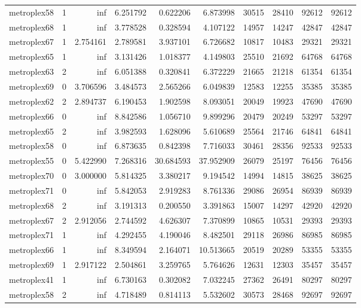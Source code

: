 \begin{longtable}{|l|r|r|r|r|r|r|r|r|r|}
metroplex58 & 1 & inf & 6.251792 & 0.622206 & 6.873998 & 30515 & 28410 & 92612 & 92612 \\
metroplex68 & 1 & inf & 3.778528 & 0.328594 & 4.107122 & 14957 & 14247 & 42847 & 42847 \\
metroplex67 & 1 & 2.754161 & 2.789581 & 3.937101 & 6.726682 & 10817 & 10483 & 29321 & 29321 \\
metroplex65 & 1 & inf & 3.131426 & 1.018377 & 4.149803 & 25510 & 21692 & 64768 & 64768 \\
metroplex63 & 2 & inf & 6.051388 & 0.320841 & 6.372229 & 21665 & 21218 & 61354 & 61354 \\
metroplex69 & 0 & 3.706596 & 3.484573 & 2.565266 & 6.049839 & 12583 & 12255 & 35385 & 35385 \\
metroplex62 & 2 & 2.894737 & 6.190453 & 1.902598 & 8.093051 & 20049 & 19923 & 47690 & 47690 \\
metroplex66 & 0 & inf & 8.842586 & 1.056710 & 9.899296 & 20479 & 20249 & 53297 & 53297 \\
metroplex65 & 2 & inf & 3.982593 & 1.628096 & 5.610689 & 25564 & 21746 & 64841 & 64841 \\
metroplex58 & 0 & inf & 6.873635 & 0.842398 & 7.716033 & 30461 & 28356 & 92533 & 92533 \\
metroplex55 & 0 & 5.422990 & 7.268316 & 30.684593 & 37.952909 & 26079 & 25197 & 76456 & 76456 \\
metroplex70 & 0 & 3.000000 & 5.814325 & 3.380217 & 9.194542 & 14994 & 14815 & 38625 & 38625 \\
metroplex71 & 0 & inf & 5.842053 & 2.919283 & 8.761336 & 29086 & 26954 & 86939 & 86939 \\
metroplex68 & 2 & inf & 3.191313 & 0.200550 & 3.391863 & 15007 & 14297 & 42920 & 42920 \\
metroplex67 & 2 & 2.912056 & 2.744592 & 4.626307 & 7.370899 & 10865 & 10531 & 29393 & 29393 \\
metroplex71 & 1 & inf & 4.292455 & 4.190046 & 8.482501 & 29118 & 26986 & 86985 & 86985 \\
metroplex66 & 1 & inf & 8.349594 & 2.164071 & 10.513665 & 20519 & 20289 & 53355 & 53355 \\
metroplex69 & 1 & 2.917122 & 2.504861 & 3.259765 & 5.764626 & 12631 & 12303 & 35457 & 35457 \\
metroplex41 & 1 & inf & 6.730163 & 0.302082 & 7.032245 & 27362 & 26491 & 80297 & 80297 \\
metroplex58 & 2 & inf & 4.718489 & 0.814113 & 5.532602 & 30573 & 28468 & 92697 & 92697 \\

\end{longtable}
